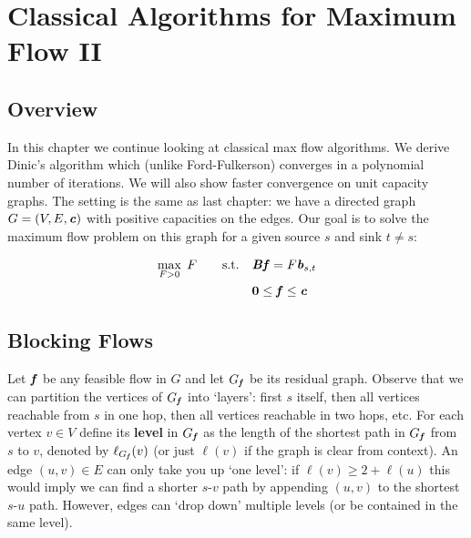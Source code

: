 %
%


\chapter{Classical
  Algorithms for Maximum Flow II}
\label{cha:maxflow2}

%

\sloppy

\section{Overview}
In this chapter we continue looking at classical max flow algorithms. We derive Dinic's algorithm which
(unlike Ford-Fulkerson) converges in a polynomial number of iterations. We will also show faster
convergence on unit capacity graphs.
The setting is the same as last chapter: we have a directed graph $G = (V, E, \boldsymbol{\mathit{c}})$ with
positive capacities
on the edges. Our goal is to solve the maximum flow problem on this graph for a given source $s$ and sink
$t \neq s$:

\begin{align}
  \begin{aligned}
    \max_{F>0} \;F\qquad\text{s.t.}\quad&\boldsymbol{\mathit{B}}\boldsymbol{\mathit{f}} = F\boldsymbol{\mathit{b}}_{s,t} \\
    &\boldsymbol{0}\leq \boldsymbol{\mathit{f}}\leq \boldsymbol{\mathit{c}}
  \end{aligned}
\end{align}

\section{Blocking Flows}
Let $\boldsymbol{\mathit{f}}$ be any feasible flow in $G$ and let $G_{\boldsymbol{\mathit{f}}}$ be its residual graph.
Observe that we can partition the
vertices of $G_{\boldsymbol{\mathit{f}}}$ into `layers': first $s$ itself, then all vertices reachable from $s$ in one hop, then all
vertices reachable in two hops, etc. For each vertex $v\in V$ define its \textbf{level} in $G_{\boldsymbol{\mathit{f}}}$ as the
length of the shortest path in $G_{\boldsymbol{\mathit{f}}}$ from $s$ to $v$, denoted by $\ell_{G_{\boldsymbol{\mathit{f}}}}(v)$ (or just $\ell(v)$ if the
graph is clear from context). An edge $(u, v) \in E$ can only take you up `one level': if
$\ell(v) \geq 2+\ell(u)$ this would imply we can find a shorter $s$-$v$ path by appending $(u, v)$ to the
shortest $s$-$u$ path. However, edges can `drop down' multiple levels (or be contained in the same level).

